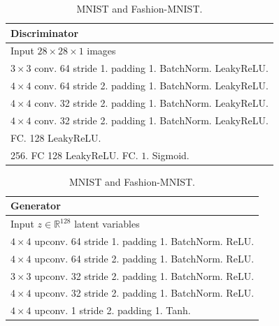 \begin{table}[!t]
\caption{Architecture of BIGAN and GMM-BIGAN}
    \centering
        \vspace*{1ex}
    \begin{subtable}[h]{\textwidth}
    \caption{MNIST and Fashion-MNIST.}
    \centering
        \begin{tabular}{|l|}
        \toprule
        \textbf{Discriminator}  \\
        \midrule
        Input $28\times28\times1$ images  \\
        \hline 
        $3\times3$ conv. 64 stride 1. padding 1. BatchNorm. LeakyReLU. \\
        \hline 
        $4\times4$ conv. 64 stride 2. padding 1. BatchNorm. LeakyReLU. \\
        \hline 
        $4\times4$ conv. 32 stride 2. padding 1. BatchNorm. LeakyReLU. \\
        \hline
        $4\times4$ conv. 32  stride 2. padding 1. BatchNorm. LeakyReLU.  \\
        \hline
        FC. 128 LeakyReLU.   \\
        \hline
        256. FC 128 LeakyReLU. FC. $1$. Sigmoid. \\
        \bottomrule
        \end{tabular}
    \vspace*{1ex}
    \end{subtable}
    \begin{subtable}[h]{\textwidth}
    \centering
        \begin{tabular}{|l|}
        \toprule
        \textbf{Generator} \\
        \midrule
         Input $z\in \mathbb{R}^{128}$ latent variables \\
        \hline 
        $4\times4$ upconv. 64 stride 1. padding 1. BatchNorm. ReLU. \\
        \hline 
        $4\times4$ upconv. 64 stride 2. padding 1. BatchNorm. ReLU. \\
        \hline
        $3\times3$ upconv. 32 stride 2. padding 1. BatchNorm. ReLU. \\
        \hline
        $4\times4$ upconv. 32 stride 2. padding 1. BatchNorm. ReLU. \\
        \hline
        $4\times4$ upconv. 1 \hspace{0.2em} stride 2. padding 1. Tanh. \\
        \bottomrule
        \end{tabular}

\end{subtable}
\end{table}
